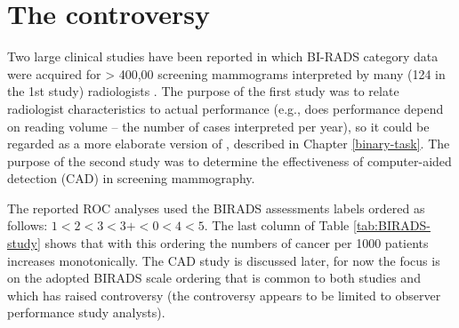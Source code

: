 \documentclass[
]{book}
\begin{document}
\hypertarget{binary-task-birads-rating-scale-controversy}{%
\section{The controversy}\label{binary-task-birads-rating-scale-controversy}}

Two large clinical studies have been reported in which BI-RADS category data were acquired for \textgreater{} 400,00 screening mammograms interpreted by many (124 in the 1st study) radiologists \citep{barlow2004accuracy, fenton2007influence}. The purpose of the first study was to relate radiologist characteristics to actual performance (e.g., does performance depend on reading volume -- the number of cases interpreted per year), so it could be regarded as a more elaborate version of \citep{RN1087}, described in Chapter \ref{binary-task}. The purpose of the second study was to determine the effectiveness of computer-aided detection (CAD) in screening mammography.

The reported ROC analyses used the BIRADS assessments labels ordered as follows: \(1 < 2 < 3 < 3+ < 0 < 4 < 5\). The last column of Table \ref{tab:BIRADS-study} shows that with this ordering the numbers of cancer per 1000 patients increases monotonically. The CAD study is discussed later, for now the focus is on the adopted BIRADS scale ordering that is common to both studies and which has raised controversy (the controversy appears to be limited to observer performance study analysts).
\end{document}
